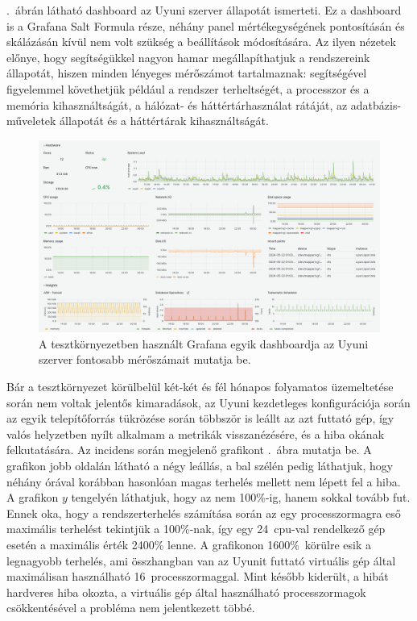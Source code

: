 .~ábrán látható dashboard az Uyuni szerver állapotát ismerteti. Ez a dashboard is a Grafana Salt Formula része, néhány panel mértékegységének pontosításán és skálázásán kívül nem volt szükség a beállítások módosítására. Az ilyen nézetek előnye, hogy segítségükkel nagyon hamar megállapíthatjuk a rendszereink állapotát, hiszen minden lényeges mérőszámot tartalmaznak: segítségével figyelemmel követhetjük például a rendszer terheltségét, a processzor és a memória kihasználtságát, a hálózat- és háttértárhasználat rátáját, az adatbázis-műveletek állapotát és a háttértárak kihasználtságát.

\begin{figure}[ht]
	\centering
	\includegraphics[width=15cm]{figures/grafana-uyuni-server.png}
	\caption{A tesztkörnyezetben használt Grafana egyik dashboardja az Uyuni szerver fontosabb mérőszámait mutatja be.}
	\label{fig:grafana-uyuni-server}
\end{figure}

Bár a tesztkörnyezet körülbelül két-két és fél hónapos folyamatos üzemeltetése során nem voltak jelentős kimaradások, az Uyuni kezdetleges konfigurációja során az egyik telepítőforrás tükrözése során többször is leállt az azt futtató gép, így valós helyzetben nyílt alkalmam a metrikák visszanézésére, és a hiba okának felkutatására. Az incidens során megjelenő grafikont .~ábra mutatja be. A grafikon jobb oldalán látható a négy leállás, a bal szélén pedig láthatjuk, hogy néhány órával korábban hasonlóan magas terhelés mellett nem lépett fel a hiba. A grafikon $ y $ tengelyén láthatjuk, hogy az nem 100\%-ig, hanem sokkal tovább fut. Ennek oka, hogy a rendszerterhelés számítása során az egy processzormagra eső maximális terhelést tekintjük a 100\%-nak, így egy 24~\acrshort{cpu}-val rendelkező gép esetén a maximális érték 2400\% lenne. A grafikonon 1600\%~körülre esik a legnagyobb terhelés, ami összhangban van az Uyunit futtató virtuális gép által maximálisan használható 16~processzormaggal. Mint később kiderült, a hibát hardveres hiba okozta, a virtuális gép által használható processzormagok csökkentésével a probléma nem jelentkezett többé.

